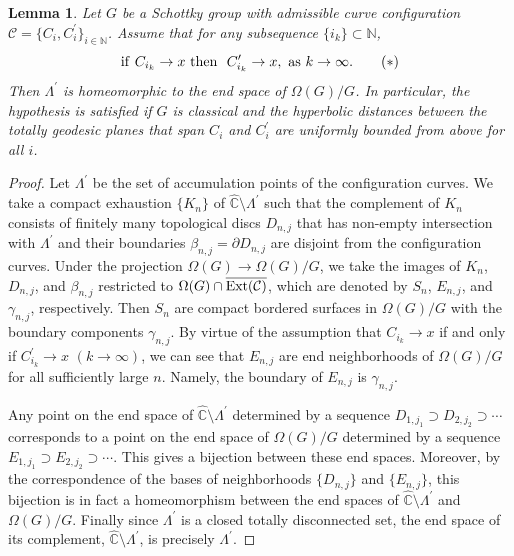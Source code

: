\documentclass[12pt]{amsart}
\theoremstyle{plain}
\newtheorem{lem}[thm]{Lemma}
\DeclareMathOperator{\Ext}{\rm Ext}
\begin{document}
\begin{lem}\label{end}
Let $G$ be a Schottky group with admissible curve configuration $\mathcal{C}=\{C_i ,C_i^{\prime}\}_{i \in \mathbb N}$. Assume that 
for any  subsequence $\{i_k\} \subset \mathbb N$,
\begin{equation}\label{*}
{\rm if }\ C_{i_k}  \rightarrow x \ \mbox{\rm then } \ C_{i_k}^{\prime}  \rightarrow x, \ {\rm as}\ k \to \infty.
\tag{$\ast$}
\end{equation}
Then $\Lambda^{\prime}$ is homeomorphic to the end space  of 
$\Omega(G)/G$. In particular, the hypothesis is satisfied if $G$ is classical and the hyperbolic distances 
between the totally geodesic planes that span $C_i$ and $C_i^{\prime}$ are uniformly bounded  
from above for all $i$.
\end{lem}



\begin{proof} Let $\Lambda^{\prime}$ be the set of accumulation points of the configuration curves.  
We take a compact exhaustion $\{K_n\}$ of $\widehat{\mathbb {C}}\setminus\Lambda^{\prime}$ such that
the complement of $K_n$ consists of finitely many topological discs $D_{n,j}$ that has  non-empty 
intersection with $\Lambda^{\prime}$ and their boundaries $\beta_{n,j}=\partial D_{n,j}$
are disjoint from the configuration curves. Under the projection $\Omega(G) \to \Omega(G)/G$,
we take the images of $K_n$, $D_{n,j}$, and $\beta_{n,j}$ restricted to $\Omega(G) \cap \overline{\Ext(\mathcal C)}$, which are denoted by
$S_n$, $E_{n,j}$, and $\gamma_{n,j}$, respectively. Then $S_n$ are compact bordered surfaces in $\Omega(G)/G$
with the boundary components $\gamma_{n,j}$.
By virtue of the assumption that $C_{i_k} \rightarrow x$ if and only if 
$C_{i_k}^{\prime} \rightarrow x$ $(k \to \infty)$, we can see that
$E_{n,j}$ are end neighborhoods of $\Omega(G)/G$ for all sufficiently large $n$. Namely,
the boundary of $E_{n,j}$ is $\gamma_{n,j}$.

Any point on the end space of $\widehat{\mathbb {C}}\setminus\Lambda^{\prime}$ determined by a sequence $D_{1,j_1} \supset D_{2,j_2} \supset \cdots$
corresponds to a point on the end space of $\Omega(G)/G$ determined 
by a sequence $E_{1,j_1} \supset E_{2,j_2} \supset \cdots$. This gives a bijection between these end spaces.
Moreover, by the correspondence of the bases of neighborhoods $\{D_{n,j}\}$ and $\{E_{n,j}\}$,
this bijection is in fact a homeomorphism between the end spaces of
 $\widehat{\mathbb {C}}\setminus\Lambda^{\prime}$ and $\Omega(G)/G$. Finally since  
 $\Lambda^{\prime}$ is a closed  totally disconnected set, the end space of its complement,
 $\widehat{\mathbb {C}}\setminus\Lambda^{\prime}$, is precisely $\Lambda^{\prime}$.
\end{proof}
\end{document}
